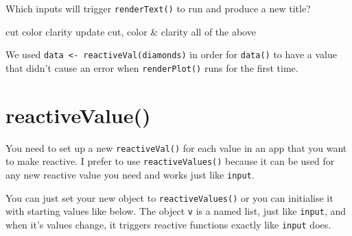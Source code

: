\documentclass[
]{book}
\begin{document}
Which inputs will trigger \texttt{renderText()} to run and produce a new title?

cut color clarity update cut, color \& clarity all of the above

We used \texttt{data\ \textless{}-\ reactiveVal(diamonds)} in order for \texttt{data()} to have a value that didn't cause an error when \texttt{renderPlot()} runs for the first time.

\hypertarget{reactivevalue}{%
\section{reactiveValue()}\label{reactivevalue}}

You need to set up a new \texttt{reactiveVal()} for each value in an app that you want to make reactive. I prefer to use \texttt{reactiveValues()} because it can be used for any new reactive value you need and works just like \texttt{input}.

You can just set your new object to \texttt{reactiveValues()} or you can initialise it with starting values like below. The object \texttt{v} is a named list, just like \texttt{input}, and when it's values change, it triggers reactive functions exactly like \texttt{input} does.
\end{document}
